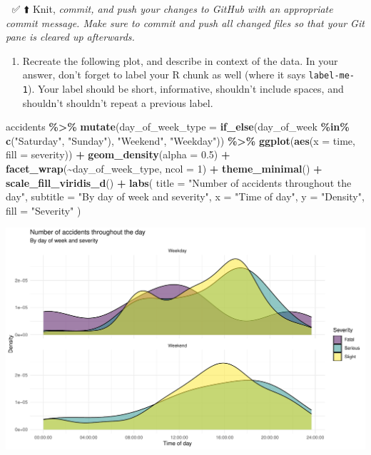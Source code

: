 \documentclass[
]{article}
\newenvironment{Shaded}{\begin{snugshade}}{\end{snugshade}}
\newcommand{\AttributeTok}[1]{\textcolor[rgb]{0.13,0.29,0.53}{#1}}
\newcommand{\DecValTok}[1]{\textcolor[rgb]{0.00,0.00,0.81}{#1}}
\newcommand{\FloatTok}[1]{\textcolor[rgb]{0.00,0.00,0.81}{#1}}
\newcommand{\FunctionTok}[1]{\textcolor[rgb]{0.13,0.29,0.53}{\textbf{#1}}}
\newcommand{\NormalTok}[1]{#1}
\newcommand{\SpecialCharTok}[1]{\textcolor[rgb]{0.81,0.36,0.00}{\textbf{#1}}}
\newcommand{\StringTok}[1]{\textcolor[rgb]{0.31,0.60,0.02}{#1}}
\providecommand{\tightlist}{%
  \setlength{\itemsep}{0pt}\setlength{\parskip}{0pt}}
\begin{document}
🧶 ✅ ⬆️ Knit, \emph{commit, and push your changes to GitHub with an
appropriate commit message. Make sure to commit and push all changed
files so that your Git pane is cleared up afterwards.}

\begin{enumerate}
\def\labelenumi{\arabic{enumi}.}
\setcounter{enumi}{2}
\tightlist
\item
  Recreate the following plot, and describe in context of the data. In
  your answer, don't forget to label your R chunk as well (where it says
  \texttt{label-me-1}). Your label should be short, informative,
  shouldn't include spaces, and shouldn't shouldn't repeat a previous
  label.
\end{enumerate}

\begin{Shaded}
\begin{Highlighting}[]
\NormalTok{accidents }\SpecialCharTok{\%\textgreater{}\%}
  \FunctionTok{mutate}\NormalTok{(}\AttributeTok{day\_of\_week\_type =} \FunctionTok{if\_else}\NormalTok{(day\_of\_week }\SpecialCharTok{\%in\%} \FunctionTok{c}\NormalTok{(}\StringTok{"Saturday"}\NormalTok{, }\StringTok{"Sunday"}\NormalTok{), }\StringTok{"Weekend"}\NormalTok{, }\StringTok{"Weekday"}\NormalTok{)) }\SpecialCharTok{\%\textgreater{}\%}
  \FunctionTok{ggplot}\NormalTok{(}\FunctionTok{aes}\NormalTok{(}\AttributeTok{x =}\NormalTok{ time, }\AttributeTok{fill =}\NormalTok{ severity)) }\SpecialCharTok{+}
  \FunctionTok{geom\_density}\NormalTok{(}\AttributeTok{alpha =} \FloatTok{0.5}\NormalTok{) }\SpecialCharTok{+}
  \FunctionTok{facet\_wrap}\NormalTok{(}\SpecialCharTok{\textasciitilde{}}\NormalTok{day\_of\_week\_type, }\AttributeTok{ncol =} \DecValTok{1}\NormalTok{) }\SpecialCharTok{+}
  \FunctionTok{theme\_minimal}\NormalTok{() }\SpecialCharTok{+}
  \FunctionTok{scale\_fill\_viridis\_d}\NormalTok{() }\SpecialCharTok{+}
  \FunctionTok{labs}\NormalTok{(}
    \AttributeTok{title =} \StringTok{"Number of accidents throughout the day"}\NormalTok{,}
    \AttributeTok{subtitle =} \StringTok{"By day of week and severity"}\NormalTok{,}
    \AttributeTok{x =} \StringTok{"Time of day"}\NormalTok{,}
    \AttributeTok{y =} \StringTok{"Density"}\NormalTok{,}
    \AttributeTok{fill =} \StringTok{"Severity"}
\NormalTok{  )}
\end{Highlighting}
\end{Shaded}

\includegraphics[width=0.8\linewidth]{hw-03-accidents_files/figure-latex/time_severity_plot-1}
\end{document}
